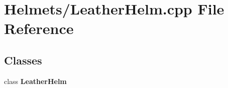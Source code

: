 \section{Helmets/\-Leather\-Helm.cpp File Reference}
\label{_leather_helm_8cpp}
\subsection*{Classes}
\begin{DoxyCompactItemize}
\item 
class {\bf Leather\-Helm}
\end{DoxyCompactItemize}
